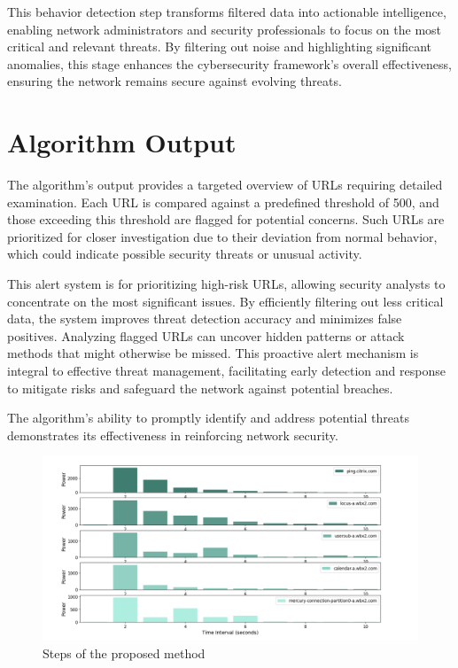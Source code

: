 This behavior detection step transforms filtered data into actionable intelligence, enabling network administrators and security professionals to focus on the most critical and relevant threats. By filtering out noise and highlighting significant anomalies, this stage enhances the cybersecurity framework's overall effectiveness, ensuring the network remains secure against evolving threats.

\section{Algorithm Output}

The algorithm's output provides a targeted overview of URLs requiring detailed examination. Each URL is compared against a predefined threshold of 500, and those exceeding this threshold are flagged for potential concerns. Such URLs are prioritized for closer investigation due to their deviation from normal behavior, which could indicate possible security threats or unusual activity.

This alert system is  for prioritizing high-risk URLs, allowing security analysts to concentrate on the most significant issues. By efficiently filtering out less critical data, the system improves threat detection accuracy and minimizes false positives. Analyzing flagged URLs can uncover hidden patterns or attack methods that might otherwise be missed. This proactive alert mechanism is integral to effective threat management, facilitating early detection and response to mitigate risks and safeguard the network against potential breaches.

The algorithm's ability to promptly identify and address potential threats demonstrates its effectiveness in reinforcing network security.


\begin{figure}
    \centering
     \includegraphics[width=\textwidth, height=0.5\textheight]{../Thesis_Docs/media/algorithm final output.png}
    \caption{Steps of the proposed method}
    \label{fig:final}
\end{figure}

